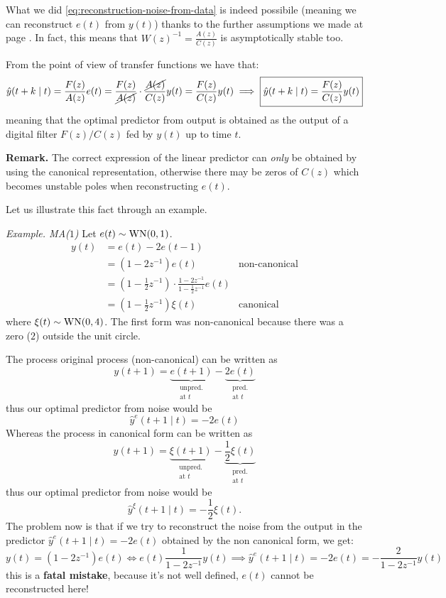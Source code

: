 
What we did \eqref{eq:reconstruction-noise-from-data} is indeed possibile (meaning we can reconstruct $e(t)$ from $y(t)$) thanks to the further assumptions we made at page \pageref{further-assumptions-prediction-theory}. In fact, this means that $W(z)^{-1}=\frac{A(z)}{C(z)}$ is asymptotically stable too.

From the point of view of transfer functions we have that:
\[
	\hat y (t+k\mid t) = \frac{F(z)}{A(z)}e(t) =\frac{F(z)}{\cancel{A(z)}}\cdot\frac{\cancel{A(z)}}{C(z)}y(t) =\frac{F(z)}{C(z)}y(t) \implies \boxed{\hat y (t+k\mid t) = \frac{F(z)}{C(z)}y(t)}
\]
meaning that the optimal predictor from output is obtained as the output of a digital filter $F(z)/C(z)$ fed by $y(t)$ up to time $t$.

\textbf{Remark.}
The correct expression of the linear predictor can \emph{only} be obtained by using the canonical representation, otherwise there may be zeros of $C(z)$ which becomes unstable poles when reconstructing $e(t)$.

Let us illustrate this fact through an example.

\emph{Example. MA($1$)}
Let $e(t)\sim \operatorname{WN}(0,1)$.
\begin{align*}
	y(t) &= e(t) - 2 e(t-1)\\
	&= (1-2z^{-1} )e(t) &\text{non-canonical}\\
	&=\left( 1-\frac{1}{2} z^{-1}  \right) \cdot\frac{1-2z^{-1}}{1-\frac{1}{2} z^{-1}} e(t)\\
	&=\left( 1-\frac{1}{2} z^{-1}  \right) \xi(t) &\text{canonical}
\end{align*}
where $\xi(t)\sim \operatorname{WN}(0,4)$. The first form was non-canonical because there was a zero ($2$) outside the unit circle.

The process original process (non-canonical) can be written as
\[
	y(t+1)=\underbrace{e(t+1)}_{\substack{\text{unpred.}\\\text{at $t$}}}-\underbrace{2e(t)}_{\substack{\text{pred.}\\\text{at $t$}}}
\]
thus our optimal predictor from noise would be
\[
	\hat y^{e} (t+1\mid t) = -2e(t)
\]
Whereas the process in canonical form can be written as 
\[
	y(t+1) =\underbrace{\xi(t+1)}_{\substack{\text{unpred.}\\\text{at $t$}}}-\underbrace{\frac{1}{2} \xi(t)}_{\substack{\text{pred.}\\\text{at $t$}}}
\]
thus our optimal predictor from noise would be
\[
	\hat y^{\xi} (t+1\mid t)=-\frac{1}{2} \xi(t).
\]
The problem now is that if we try to reconstruct the noise from the output in the predictor $\hat y^{e} (t+1\mid t) = -2e(t)$ obtained by the non canonical form, we get:
\[
	y(t)=(1-2z^{-1})e(t) \iff e(t) \frac{1}{1-2z^{-1}} y(t) \implies \hat y^{e} (t+1\mid t) = -2e(t) = -\frac{2}{1-2z^{-1}}y(t)
\]
this is a \textbf{fatal mistake}, because it's not well defined, $e(t)$ cannot be reconstructed here!

